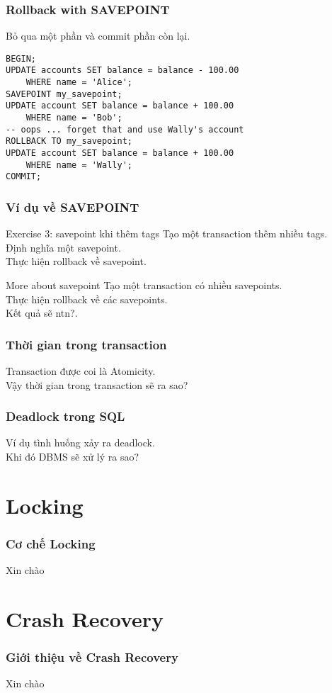 \documentclass[xcolor={table, dvipsnames}]{beamer}
\begin{document}
\begin{frame}[fragile]
\frametitle{Rollback with SAVEPOINT}
Bỏ qua một phần và commit phần còn lại.\\
\pause
\begin{verbatim}
BEGIN;
UPDATE accounts SET balance = balance - 100.00
	WHERE name = 'Alice';
SAVEPOINT my_savepoint;
UPDATE account SET balance = balance + 100.00
	WHERE name = 'Bob';
-- oops ... forget that and use Wally's account
ROLLBACK TO my_savepoint;
UPDATE account SET balance = balance + 100.00
	WHERE name = 'Wally';
COMMIT;
\end{verbatim}
\end{frame}
\begin{frame}
\frametitle{Ví dụ về SAVEPOINT}
\begin{block}{Exercise 3: savepoint khi thêm tags}
Tạo một transaction thêm nhiều tags.\\
Định nghĩa một savepoint.\\
Thực hiện rollback về savepoint.\\
\end{block}
\pause
\begin{block}{More about savepoint}
Tạo một transaction có nhiều savepoints.\\
Thực hiện rollback về các savepoints.\\
Kết quả sẽ ntn?.
\end{block}
\end{frame}

\begin{frame}
\frametitle{Thời gian trong transaction}
Transaction được coi là Atomicity.\\
Vậy thời gian trong transaction sẽ ra sao?\\
\end{frame}

\begin{frame}
\frametitle{Deadlock trong SQL}
Ví dụ tình huống xảy ra deadlock.\\
Khi đó DBMS sẽ xử lý ra sao?\\
\end{frame}

\section{Locking}

\begin{frame}
\frametitle{Cơ chế Locking}

Xin chào

\end{frame}

\section{Crash Recovery}

\begin{frame}
\frametitle{Giới thiệu về Crash Recovery}

Xin chào

\end{frame}
\end{document}
